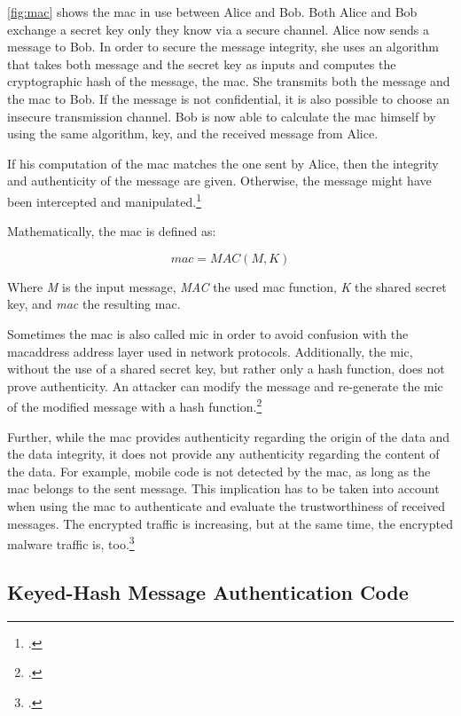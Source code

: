\autoref{fig:mac} shows the \gls{mac} in use between Alice and Bob. Both Alice and Bob exchange a secret key only they know via a secure channel. Alice now sends a message to Bob. In order to secure the message integrity, she uses an algorithm that takes both message and the secret key as inputs and computes the cryptographic hash of the message, the \gls{mac}. She transmits both the message and the \gls{mac} to Bob. If the message is not confidential, it is also possible to choose an insecure transmission channel. Bob is now able to calculate the \gls{mac} himself by using the same algorithm, key, and the received message from Alice.

If his computation of the \gls{mac} matches the one sent by Alice, then the integrity and authenticity of the message are given. Otherwise, the message might have been intercepted and manipulated.\footcites[See][320]{Paar2010}

Mathematically, the \gls{mac} is defined as:

\begin{equation*}
	mac = MAC(M, K)
\end{equation*}

Where \textit{M} is the input message, \textit{MAC} the used \gls{mac} function, \textit{K} the shared secret key, and \textit{mac} the resulting \glsdesc{mac}.

Sometimes the \gls{mac} is also called \gls{mic} in order to avoid confusion with the \gls{macaddress} address layer used in network protocols. Additionally, the \gls{mic}, without the use of a shared secret key, but rather only a hash function, does not prove authenticity. An attacker can modify the message and re-generate the \gls{mic} of the modified message with a hash function.\footcites[See][60--62]{265831}

Further, while the \gls{mac} provides authenticity regarding the origin of the data and the data integrity, it does not provide any authenticity regarding the content of the data. For example, mobile code is not detected by the \gls{mac}, as long as the \gls{mac} belongs to the sent message. This implication has to be taken into account when using the \gls{mac} to authenticate and evaluate the trustworthiness of received messages. The encrypted traffic is increasing, but at the same time, the encrypted malware traffic is, too.\footcites[See][100]{weldon2015}

\subsection{Keyed-Hash Message Authentication Code}

